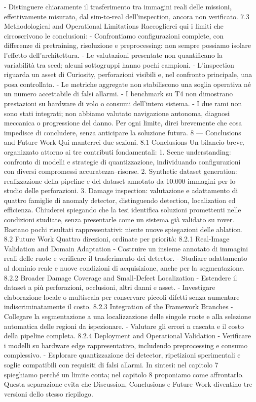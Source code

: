 - Distinguere chiaramente il trasferimento tra immagini reali delle missioni, effettivamente misurato, dal sim-to-real dell’inspection, ancora non verificato.
7.3 Methodological and Operational Limitations
Raccoglierei qui i limiti che circoscrivono le conclusioni:
- Confrontiamo configurazioni complete, con differenze di pretraining, risoluzione e preprocessing: non sempre possiamo isolare l’effetto dell’architettura.
- Le valutazioni presentate non quantificano la variabilità tra seed; alcuni sottogruppi hanno pochi campioni.
- L’inspection riguarda un asset di Curiosity, perforazioni visibili e, nel confronto principale, una posa controllata.
- Le metriche aggregate non stabiliscono una soglia operativa né un numero accettabile di falsi allarmi.
- I benchmark su T4 non dimostrano prestazioni su hardware di volo o consumi dell’intero sistema.
- I due rami non sono stati integrati; non abbiamo valutato navigazione autonoma, diagnosi meccanica o progressione del danno.
Per ogni limite, direi brevemente che cosa impedisce di concludere, senza anticipare la soluzione futura.
8 — Conclusions and Future Work
Qui manterrei due sezioni.
8.1 Conclusions
Un bilancio breve, organizzato attorno ai tre contributi fondamentali:
1. Scene understanding: confronto di modelli e strategie di quantizzazione, individuando configurazioni con diversi compromessi accuratezza–risorse.
2. Synthetic dataset generation: realizzazione della pipeline e del dataset annotato da 10.000 immagini per lo studio delle perforazioni.
3. Damage inspection: valutazione e adattamento di quattro famiglie di anomaly detector, distinguendo detection, localization ed efficienza.
Chiuderei spiegando che la tesi identifica soluzioni promettenti nelle condizioni studiate, senza presentarle come un sistema già validato su rover. Bastano pochi risultati rappresentativi: niente nuove spiegazioni delle ablation.
8.2 Future Work
Quattro direzioni, ordinate per priorità:
8.2.1 Real-Image Validation and Domain Adaptation
- Costruire un insieme annotato di immagini reali delle ruote e verificare il trasferimento dei detector.
- Studiare adattamento al dominio reale e nuove condizioni di acquisizione, anche per la segmentazione.
8.2.2 Broader Damage Coverage and Small-Defect Localization
- Estendere il dataset a più perforazioni, occlusioni, altri danni e asset.
- Investigare elaborazione locale o multiscala per conservare piccoli difetti senza aumentare indiscriminatamente il costo.
8.2.3 Integration of the Framework Branches
- Collegare la segmentazione a una localizzazione delle singole ruote e alla selezione automatica delle regioni da ispezionare.
- Valutare gli errori a cascata e il costo della pipeline completa.
8.2.4 Deployment and Operational Validation
- Verificare i modelli su hardware edge rappresentativo, includendo preprocessing e consumo complessivo.
- Esplorare quantizzazione dei detector, ripetizioni sperimentali e soglie compatibili con requisiti di falsi allarmi.
In sintesi: nel capitolo 7 spieghiamo perché un limite conta; nel capitolo 8 proponiamo come affrontarlo. Questa separazione evita che Discussion, Conclusions e Future Work diventino tre versioni dello stesso riepilogo.